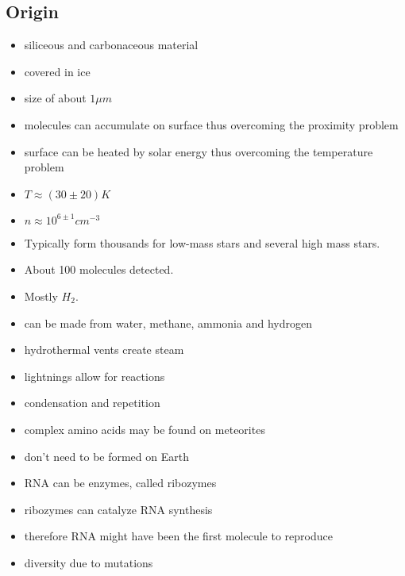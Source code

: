 \documentclass{article}
\theoremstyle{sltheorem}
\begin{document}
\subsection{Origin}
\begin{itemize}
    \item siliceous and carbonaceous material
    \item covered in ice
    \item size of about $1\mu m$
    \item molecules can accumulate on surface thus overcoming the proximity problem
    \item surface can be heated by solar energy thus overcoming the temperature problem
\end{itemize}
\begin{itemize}
    \item $T\approx (30\pm20)K$
    \item $n\approx 10^{6\pm1}cm^{-3}$
    \item Typically form thousands for low-mass stars and several high mass stars.
    \item About 100 molecules detected.
    \item Mostly $H_2$.
\end{itemize}
\begin{itemize}
    \item can be made from water, methane, ammonia and hydrogen
    \item hydrothermal vents create steam
    \item lightnings allow for reactions
    \item condensation and repetition
\end{itemize}
\begin{itemize}
    \item complex amino acids may be found on meteorites
    \item don't need to be formed on Earth
\end{itemize}
\begin{itemize}
    \item RNA can be enzymes, called ribozymes
    \item ribozymes can catalyze RNA synthesis
    \item therefore RNA might have been the first molecule to reproduce
    \item diversity due to mutations
\end{itemize}
\end{document}
